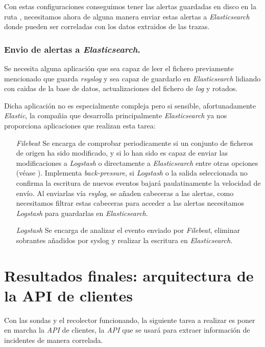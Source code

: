 Con estas configuraciones conseguimos tener las alertas guardadas en disco en la ruta , necesitamos
ahora de alguna manera enviar estas alertas a \emph{Elasticsearch} donde pueden ser correladas con los datos extraidos de las trazas.

\subsubsection{Envio de alertas a \emph{Elasticsearch}.}

Se necesita alguna aplicación que sea capaz de leer el fichero previamente mencionado que guarda \emph{rsyslog} y sea capaz de guardarlo
en \emph{Elasticsearch} lidiando con caidas de la base de datos, actualizaciones del fichero de \emph{log} y rotados.

Dicha aplicación no es especialmente compleja pero si sensible, afortunadamente \emph{Elastic}, la compañia que desarrolla principalmente
\emph{Elasticsearch} ya nos proporciona aplicaciones que realizan esta tarea:

\begin{itemize}
    \item[\emph{Filebeat}] Se encarga de comprobar periodicamente si un conjunto de ficheros de origen ha sido modificado, y si lo han sido
    es capaz de enviar las modificaciones a \emph{Logstash} o directamente a \emph{Elasticsearch} entre otras opciones (véase \cite{elastic-filebeat}). Implementa 
    \emph{back-pressure}, si \emph{Logstash} o la salida seleccionada no confirma la escritura de nuevos eventos bajará paulatinamente la velocidad de envío. 
    Al enviarlas vía \emph{rsylog}, se añaden cabeceras a las alertas, como necesitamos filtrar estas cabeceras para acceder a las alertas necesitamos \emph{Logstash} para 
    guardarlas en \emph{Elasticsearch}.
    \item[\emph{Logstash}] Se encarga de analizar el evento enviado por \emph{Filebeat}, eliminar sobrantes añadidos por syslog y realizar la escritura en
    \emph{Elasticsearch}.
\end{itemize}

\section{Resultados finales: arquitectura de la API de clientes}

Con las sondas y el recolector funcionando, la siguiente tarea a realizar es poner en marcha la \emph{API} de clientes, 
la \emph{API} que se usará para extraer información de incidentes de manera correlada.

